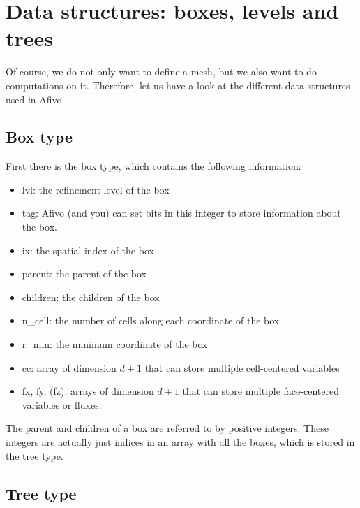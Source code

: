 \documentclass[a4paper, a4wide]{article}
\begin{document}
\section{Data structures: boxes, levels and trees}
\label{sec:data-structures}

Of course, we do not only want to define a mesh, but we also want to do
computations on it. Therefore, let us have a look at the different data
structures used in Afivo.

\subsection{Box type}
\label{sec:box-type}

First there is the box type, which contains the following information:
\begin{itemize}
  \item lvl: the refinement level of the box
  \item tag: Afivo (and you) can set bits in this integer to store information
  about the box.
  \item ix: the spatial index of the box
  \item parent: the parent of the box
  \item children: the children of the box
  \item n\_cell: the number of cells along each coordinate of the box
  \item r\_min: the minimum coordinate of the box
  \item cc: array of dimension $d+1$ that can store multiple cell-centered
  variables
  \item fx, fy, (fz): arrays of dimension $d+1$ that can store multiple
  face-centered variables or fluxes.
\end{itemize}

The parent and children of a box are referred to by positive integers.
These integers are actually just indices in an array with all the boxes, which
is stored in the tree type.

\subsection{Tree type}
\label{sec:tree-type}
\end{document}
